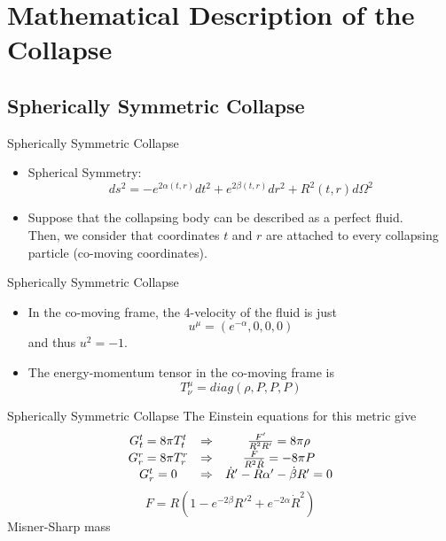 \documentclass{beamer}
\begin{document}
\section{Mathematical Description of the Collapse}    
\begin{darkframes}

\subsection{Spherically Symmetric Collapse}
\begin{frame}{Spherically Symmetric Collapse}
	\begin{itemize}
	\item<1-> Spherical Symmetry:
    $$ds^2 = -e^{2\alpha(t,r)}dt^2 + e^{2\beta(t,r)}dr^2 + R^2(t,r) d\Omega^2$$  
	\item<2-> Suppose that the collapsing body can be described as a perfect fluid. \\
    Then, we consider that coordinates $t$ and $r$ are attached to every collapsing particle (co-moving coordinates).
    \end{itemize}
\end{frame}

\begin{frame}{Spherically Symmetric Collapse}
	\begin{itemize}
	\item<1-> In the co-moving frame, the 4-velocity of the fluid is just
    $$ u^\mu = \left( e^{-\alpha},0,0,0 \right)$$
    and thus $u^2 = -1$.
    \item<2-> The energy-momentum tensor in the co-moving frame is
    $$T^\mu_\nu = diag(\rho, P,P,P)$$
    \end{itemize}
\end{frame}

\begin{frame}{Spherically Symmetric Collapse}
	The Einstein equations for this metric give
	$$
    \begin{array}{c c c}
    G^t_t = 8\pi T^t_t &\Rightarrow &\frac{F'}{R^2 R'} = 8\pi \rho \\
    G^r_r = 8\pi T^r_r &\Rightarrow &\frac{\dot{F}}{R^2 \dot{R}} = -8\pi P \\
   	G^t_r = 0 &\Rightarrow & \dot{R}'-\dot{R} \alpha'-\dot{\beta} R' =0 \\
    \end{array}$$
    \pause
    $$F = R \left( 1 - e^{-2\beta} R'^2 + e^{-2\alpha} \dot{R}^2  \right)$$
    \centering
    Misner-Sharp mass
\end{frame}


\end{darkframes}
\end{document}
